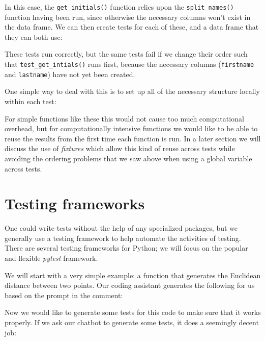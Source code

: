 

In this case, the \texttt{get\_initials()} function relies upon the \texttt{split\_names()} function having been run, since otherwise the necessary columns won't exist in the data frame.
We can then create tests for each of these, and a data frame that they can both use:



These tests run correctly, but the same tests fail if we change their order such that \texttt{test\_get\_intials()} runs first, because the necessary columns (\texttt{firstname} and \texttt{lastname}) have not yet been created.

One simple way to deal with this is to set up all of the necessary structure locally within each test:



For simple functions like these this would not cause too much computational overhead, but for computationally intensive functions we would like to be able to reuse the results from the first time each function is run.
In a later section we will discuss the use of \textit{fixtures} which allow this kind of reuse across tests while avoiding the ordering problems that we saw above when using a global variable across tests.

\section{Testing frameworks}

One could write tests without the help of any specialized packages, but we generally use a testing framework to help automate the activities of testing.
There are several testing frameworks for Python; we will focus on the popular and flexible \textit{pytest} framework.

We will start with a very simple example: a function that generates the Euclidean distance between two points.
Our coding assistant generates the following for us based on the prompt in the comment:



Now we would like to generate some tests for this code to make sure that it works properly.
If we ask our chatbot to generate some tests, it does a seemingly decent job:

